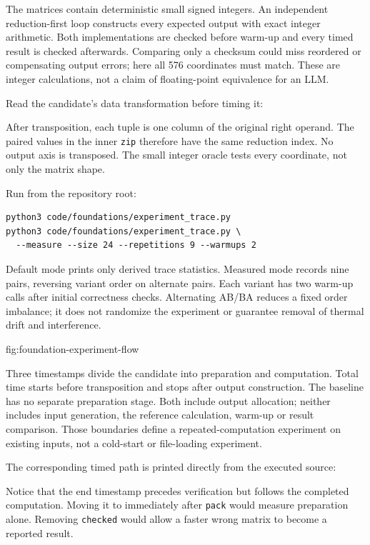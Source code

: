 The matrices contain deterministic small signed integers. An independent
reduction-first loop constructs every expected output with exact integer
arithmetic. Both implementations are checked before warm-up and every
timed result is checked afterwards. Comparing only a checksum could miss
reordered or compensating output errors; here all 576 coordinates must
match. These are integer calculations, not a claim of floating-point
equivalence for an LLM.

Read the candidate's data transformation before timing it:
\begin{minipage}{\linewidth}
\end{minipage}
After transposition, each tuple is one column of the original right
operand. The paired values in the inner \texttt{zip} therefore have
the same reduction index. No output axis is transposed. The small
integer oracle tests every coordinate, not only the matrix shape.

Run from the repository root:
\begin{verbatim}
python3 code/foundations/experiment_trace.py
python3 code/foundations/experiment_trace.py \
  --measure --size 24 --repetitions 9 --warmups 2
\end{verbatim}
Default mode prints only derived trace statistics. Measured mode records
nine pairs, reversing variant order on alternate pairs. Each variant has
two warm-up calls after initial correctness checks. Alternating AB/BA
reduces a fixed order imbalance; it does not randomize the experiment
or guarantee removal of thermal drift and interference.

{fig:foundation-experiment-flow}

Three timestamps divide the candidate into preparation and computation.
Total time starts before transposition and stops after output construction.
The baseline has no separate preparation stage. Both include output
allocation; neither includes input generation, the reference calculation,
warm-up or result comparison. Those boundaries define a repeated-computation
experiment on existing inputs, not a cold-start or file-loading experiment.

The corresponding timed path is printed directly from the executed source:
\begin{minipage}{\linewidth}
\end{minipage}
Notice that the end timestamp precedes verification but follows the
completed computation. Moving it to immediately after \texttt{pack}
would measure preparation alone. Removing \texttt{checked} would allow
a faster wrong matrix to become a reported result.


